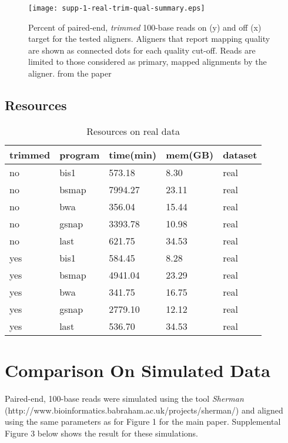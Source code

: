 \documentclass[12pt]{article}
\begin{document}
\begin{figure}[H]%
    \centerline{\texttt{[image: supp-1-real-trim-qual-summary.eps]}}
    \caption{Percent of paired-end, \emph{trimmed} 100-base reads on (y) and off (x) target for the tested aligners. Aligners that report mapping quality are shown as connected dots for each quality cut-off. Reads are limited to those considered as primary, mapped alignments by the aligner.
from the paper}\label{suppfig:02}
\end{figure}

\subsection{Resources}

\begin{table}[H]
    \centering
    \caption{Resources on real data}
    \begin{tabular}{lllll} \hline
    trimmed & program & time(min) & mem(GB) & dataset \\ \hline
    no      & bis1    & 573.18    & 8.30    & real    \\
    no      & bsmap   & 7994.27   & 23.11   & real    \\
    no      & bwa     & 356.04    & 15.44   & real    \\
    no      & gsnap   & 3393.78   & 10.98   & real    \\
    no      & last    & 621.75    & 34.53   & real    \\
    yes     & bis1    & 584.45    & 8.28    & real    \\
    yes     & bsmap   & 4941.04   & 23.29   & real    \\
    yes     & bwa     & 341.75    & 16.75   & real    \\
    yes     & gsnap   & 2779.10   & 12.12   & real    \\
    yes     & last    & 536.70    & 34.53   & real    \\
    \end{tabular}
\end{table}

\section{Comparison On Simulated Data}
Paired-end, 100-base reads were simulated using the tool \emph{Sherman} (http://www.bioinformatics.babraham.ac.uk/projects/sherman/) and aligned using the
same parameters as for Figure 1 for the main paper.
Supplemental Figure 3 below shows the result for these simulations.
\end{document}
